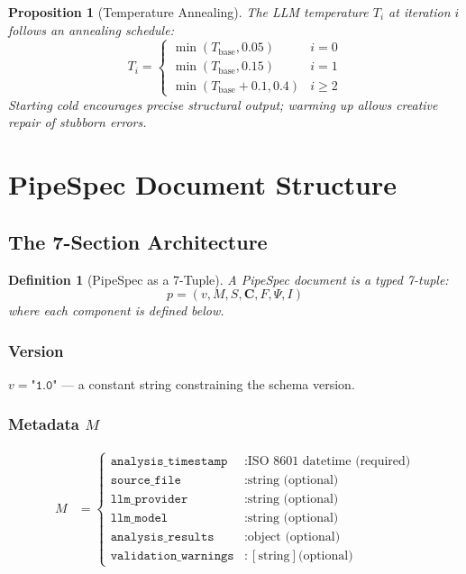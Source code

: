 \documentclass[11pt,a4paper]{article}
\newtheorem{definition}{Definition}[section]
\newtheorem{proposition}{Proposition}[section]
\theoremstyle{definition}
\begin{document}
\begin{proposition}[Temperature Annealing]
The LLM temperature $T_i$ at iteration $i$ follows an annealing schedule:
\begin{equation}
T_i =
\begin{cases}
\min(T_{\text{base}}, 0.05) & i = 0 \\
\min(T_{\text{base}}, 0.15)  & i = 1 \\
\min(T_{\text{base}} + 0.1, 0.4) & i \geq 2
\end{cases}
\end{equation}
Starting cold encourages precise structural output; warming up allows creative repair of stubborn errors.
\end{proposition}

\section{PipeSpec Document Structure}

\subsection{The 7-Section Architecture}
\begin{definition}[PipeSpec as a 7-Tuple]
A PipeSpec document is a typed 7-tuple:
\begin{equation}
p = (v, M, S, \mathbf{C}, F, \Psi, I)
\end{equation}
where each component is defined below.
\end{definition}

\subsubsection{Version}
$v = \texttt{"1.0"}$ — a constant string constraining the schema version.

\subsubsection{Metadata $M$}
\begin{align}
M &=
\begin{cases}
\texttt{analysis\_timestamp} &: \text{ISO 8601 datetime (required)} \\
\texttt{source\_file}        &: \text{string (optional)} \\
\texttt{llm\_provider}       &: \text{string (optional)} \\
\texttt{llm\_model}          &: \text{string (optional)} \\
\texttt{analysis\_results}   &: \text{object (optional)} \\
\texttt{validation\_warnings}&: [\text{string}] \text{(optional)}
\end{cases}
\end{align}
\end{document}
